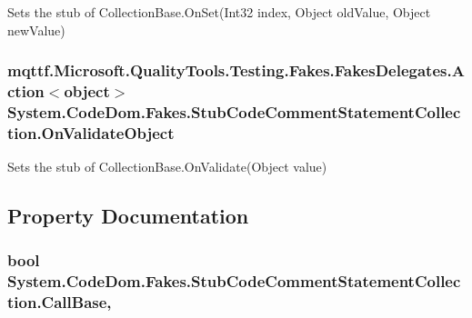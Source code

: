 Sets the stub of Collection\-Base.\-On\-Set(\-Int32 index, Object old\-Value, Object new\-Value)

\hypertarget{class_system_1_1_code_dom_1_1_fakes_1_1_stub_code_comment_statement_collection_aa4f2f450779aaa117af71e24c63f7ee4}{
\subsubsection[{On\-Validate\-Object}]{\setlength{\rightskip}{0pt plus 5cm}mqttf.\-Microsoft.\-Quality\-Tools.\-Testing.\-Fakes.\-Fakes\-Delegates.\-Action$<$object$>$ System.\-Code\-Dom.\-Fakes.\-Stub\-Code\-Comment\-Statement\-Collection.\-On\-Validate\-Object}}\label{class_system_1_1_code_dom_1_1_fakes_1_1_stub_code_comment_statement_collection_aa4f2f450779aaa117af71e24c63f7ee4}


Sets the stub of Collection\-Base.\-On\-Validate(\-Object value)



\subsection{Property Documentation}
\hypertarget{class_system_1_1_code_dom_1_1_fakes_1_1_stub_code_comment_statement_collection_a4f274388b4c8a55c162200bbff856843}{
\subsubsection[{Call\-Base}]{\setlength{\rightskip}{0pt plus 5cm}bool System.\-Code\-Dom.\-Fakes.\-Stub\-Code\-Comment\-Statement\-Collection.\-Call\-Base\hspace{0.3cm}{\ttfamily [get]}, {\ttfamily [set]}}}\label{class_system_1_1_code_dom_1_1_fakes_1_1_stub_code_comment_statement_collection_a4f274388b4c8a55c162200bbff856843}


